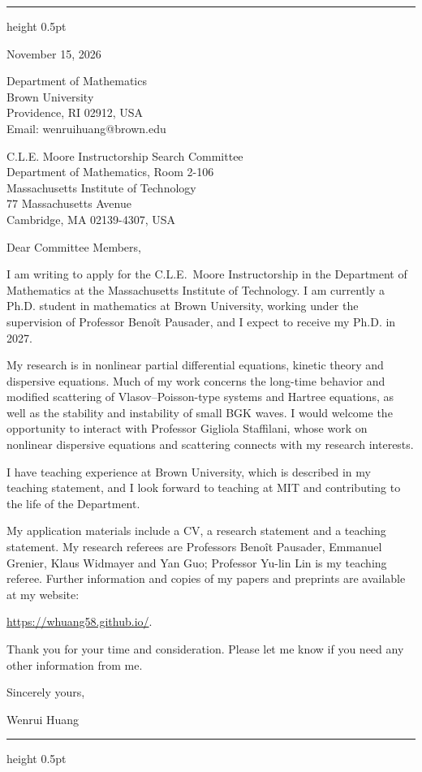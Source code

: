 \documentclass[10pt]{article}
\begin{document}
\vspace{0.08in}
\hrule height 0.5pt

\vspace{0.47in}
\hfill
\begin{minipage}{2.27in}
November 15, 2026

\vspace{0.16in}
Department of Mathematics\\
Brown University\\
Providence, RI 02912, USA\\
Email: wenrui\textunderscore huang@brown.edu
\end{minipage}

\vspace{0.30in}
C.L.E. Moore Instructorship Search Committee\\
Department of Mathematics, Room 2-106\\
Massachusetts Institute of Technology\\
77 Massachusetts Avenue\\
Cambridge, MA 02139-4307, USA

\vspace{0.16in}
Dear Committee Members,

I am writing to apply for the C.L.E.\ Moore Instructorship in the Department of Mathematics at the Massachusetts Institute of Technology. I am currently a Ph.D. student in mathematics at Brown University, working under the supervision of Professor Beno\^{i}t Pausader, and I expect to receive my Ph.D. in 2027.

My research is in nonlinear partial differential equations, kinetic theory and dispersive equations. Much of my work concerns the long-time behavior and modified scattering of Vlasov--Poisson-type systems and Hartree equations, as well as the stability and instability of small BGK waves. I would welcome the opportunity to interact with Professor Gigliola Staffilani, whose work on nonlinear dispersive equations and scattering connects with my research interests.

I have teaching experience at Brown University, which is described in my teaching statement, and I look forward to teaching at MIT and contributing to the life of the Department.

My application materials include a CV, a research statement and a teaching statement. My research referees are Professors Beno\^{i}t Pausader, Emmanuel Grenier, Klaus Widmayer and Yan Guo; Professor Yu-lin Lin is my teaching referee. Further information and copies of my papers and preprints are available at my website:

\url{https://whuang58.github.io/}.

\medskip
Thank you for your time and consideration. Please let me know if you need any other information from me.

\vspace{0.12in}
Sincerely yours,

\vspace{0.12in}
Wenrui Huang

\vfill
\hrule height 0.5pt
\end{document}
